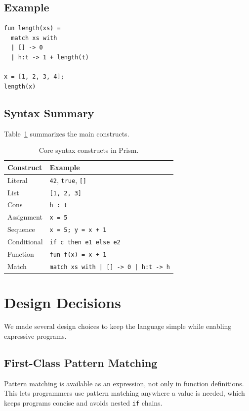 \documentclass[11pt]{article}
\begin{document}
\subsection{Example}
\begin{lstlisting}[style=prism]
fun length(xs) =
  match xs with
  | [] -> 0
  | h:t -> 1 + length(t)

x = [1, 2, 3, 4];
length(x)
\end{lstlisting}

\subsection{Syntax Summary}
Table~\ref{tab:syntax} summarizes the main constructs.

\begin{table}[h]
\centering
\begin{tabular}{ll}
\toprule
Construct & Example \\
\midrule
Literal & \texttt{42}, \texttt{true}, \texttt{[]} \\
List & \texttt{[1, 2, 3]} \\
Cons & \texttt{h : t} \\
Assignment & \texttt{x = 5} \\
Sequence & \texttt{x = 5; y = x + 1} \\
Conditional & \texttt{if c then e1 else e2} \\
Function & \texttt{fun f(x) = x + 1} \\
Match & \texttt{match xs with | [] -> 0 | h:t -> h} \\
\bottomrule
\end{tabular}
\caption{Core syntax constructs in Prism.}
\label{tab:syntax}
\end{table}

\section{Design Decisions}
We made several design choices to keep the language simple while enabling expressive programs.

\subsection{First-Class Pattern Matching}
Pattern matching is available as an expression, not only in function definitions. This lets programmers use pattern matching anywhere a value is needed, which keeps programs concise and avoids nested \texttt{if} chains.
\end{document}
